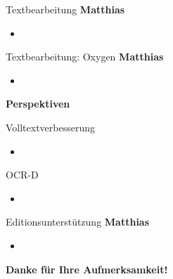 \documentclass{bbawslides}
\begin{document}
\begin{bbawslide}{Textbearbeitung}
  \vspace*{7mm}%
  \centerslidestrue%
  \textbf{Matthias}
  \begin{itemize}
    \item
  \end{itemize}
\end{bbawslide}

\begin{bbawslide}{Textbearbeitung: Oxygen}
  \vspace*{7mm}%
  \centerslidestrue%
  \textbf{Matthias}
  \begin{itemize}
    \item
  \end{itemize}
\end{bbawslide}

\begin{bbawpart}{\Large\bf Perspektiven}
\end{bbawpart}

\begin{bbawslide}{Volltextverbesserung}
  \vspace*{7mm}%
  \centerslidestrue%
  \begin{itemize}
    \item
  \end{itemize}
\end{bbawslide}

\begin{bbawslide}{OCR-D}
  \vspace*{7mm}%
  \centerslidestrue%
  \begin{itemize}
    \item
  \end{itemize}
\end{bbawslide}

\begin{bbawslide}{Editionsunterstützung}
  \vspace*{7mm}%
  \centerslidestrue%
  \textbf{Matthias}
  \begin{itemize}
    \item
  \end{itemize}
\end{bbawslide}

\begin{bbawpart}{\Large\bf Danke für Ihre Aufmerksamkeit!\\}
\end{bbawpart}
\end{document}
